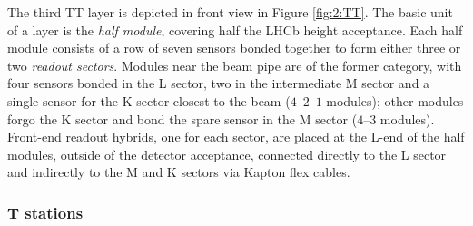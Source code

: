 The third TT layer is depicted in front view in Figure \ref{fig:2:TT}.
The basic unit of a layer is the \textit{half module}, covering half the LHCb height acceptance.
Each half module consists of a row of seven sensors bonded together to form either three or two \textit{readout sectors}.
Modules near the beam pipe are of the former category, with four sensors bonded in the L sector, two in the intermediate M sector and a single sensor for the K sector closest to the beam ($4$--$2$--$1$ modules);
other modules forgo the K sector and bond the spare sensor in the M sector ($4$--$3$ modules).
Front-end readout hybrids, one for each sector, are placed at the L-end of the half modules, outside of the detector acceptance, connected directly to the L sector and indirectly to the M and K sectors via Kapton flex cables.

\subsubsection{T stations}
